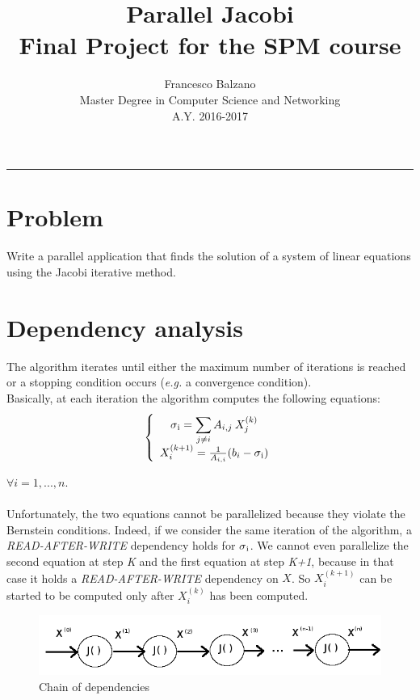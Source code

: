 \documentclass{article}
\title{ \textbf {\vspace{0.1cm}\Huge Parallel Jacobi\\ \vspace{0.3cm}}
 Final Project for the SPM course \vspace{0.5cm}\\}
\date{\vspace{1.0cm}}
\author{ \Large Francesco Balzano \vspace{0.3cm}\\ 
\Large Master Degree in Computer Science and Networking \vspace{0.4cm} \\
\Large A.Y. 2016-2017 
}
\begin{document}
  \maketitle
  \noindent\rule{18cm}{0.4pt}
  \tableofcontents
  \newpage

\clearpage
\setcounter{page}{2}
  
\section{Problem}
Write a parallel application that finds the solution of a system of linear equations using the Jacobi iterative method. 
\section{Dependency analysis} \label{dep_an}
The algorithm iterates until either the maximum number of iterations is reached or a stopping condition occurs (\textit{e.g.} a convergence condition). \\
Basically, at each iteration the algorithm computes the following equations:
\[
\left\{ 
\begin{array}{c}
\sigma\textsubscript{i} = \displaystyle\sum_{j \neq i}^{} A_{i,j} \: X_{j}^{(k)}       \\
X_{i}^{(k+1)}  = \frac{1}{A_{i,i}} (b_{i} - \sigma\textsubscript{i})                    \\ 
\end{array}
\right. 
\]

$\forall i = 1, ... , n $. \\ \\
Unfortunately, the two equations cannot be parallelized because they violate the Bernstein conditions. Indeed, if we consider the same iteration of the algorithm, a \textit{READ-AFTER-WRITE} dependency holds for $\sigma\textsubscript{i}$. We cannot even parallelize the second equation at step \textit{K} and the first equation at step \textit{K+1}, because in that case it holds a \textit{READ-AFTER-WRITE} dependency on $X$. So $X_{i}^{(k+1)}$ can be started to be computed only after $X_{i}^{(k)}$ has been computed. 

\begin{figure}[h]
\centering
\includegraphics[scale=0.43]{dependency_chain}
\caption{Chain of dependencies}
\label{fig:dep_chain}
\end{figure}     
\end{document}
